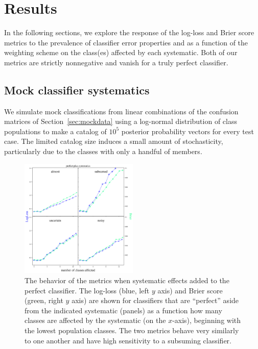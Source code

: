 \section{Results}
\label{sec:results}

In the following sections, we explore the response of the log-loss and Brier score metrics to the prevalence of classifier error properties and as a function of the weighting scheme on the class(es) affected by each systematic.
Both of our metrics are strictly nonnegative and vanish for a truly perfect classifier.

\subsection{Mock classifier systematics}
\label{sec:mockresults}

We simulate mock classifications from linear combinations of the confusion matrices of Section~\ref{sec:mockdata} using a log-normal distribution of class populations to make a catalog of $10^{5}$ posterior probability vectors for every test case.
The limited catalog size induces a small amount of stochasticity, particularly due to the classes with only a handful of members.

\begin{figure}
	\begin{center}
		\includegraphics[width=0.5\textwidth]{./fig/systematics_onlyperfect.png}
		\caption{The behavior of the metrics when systematic effects added to the perfect classifier.
		The log-loss (blue, left $y$ axis) and Brier score (green, right $y$ axis) are shown for classifiers that are ``perfect'' aside from the indicated systematic (panels) as a function how many classes are affected by the systematic (on the $x$-axis), beginning with the lowest population classes.
		The two metrics behave very similarly to one another and have high sensitivity to a subsuming classifier.}
	\end{center}
	\label{fig:cruise}
\end{figure}

